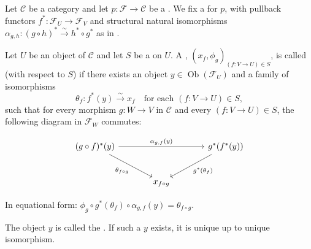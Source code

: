 \begin{definition}
\label{definition:effective_descent_datum_for_a_category_fibered_in_groupoids_over_a_category_relative_to_a_sieve_on_an_object_of_the_base_category}
Let $\mathcal{C}$ be a category and let $p: \mathcal{F} \to \mathcal{C}$ be a . We fix a  for $p$, with pullback functors $f^*: \mathcal{F}_U \to \mathcal{F}_V$ and structural natural isomorphisms $\alpha_{g,h}: (g \circ h)^* \xrightarrow{\sim} h^* \circ g^*$ as in .

Let $U$ be an object of $\mathcal{C}$ and let $S$ be a  on $U$. A , $(x_f, \phi_g)_{(f:V\to U)\in S}$, is called  (with respect to $S$) if there exists an object $y \in \operatorname{Ob}(\mathcal{F}_U)$ and a family of isomorphisms
$$
\theta_f: f^*(y) \xrightarrow{\sim} x_f \quad \text{for each } (f: V \to U) \in S,
$$
such that for every morphism $g: W \to V$ in $\mathcal{C}$ and every $(f: V \to U) \in S$, the following diagram in $\mathcal{F}_W$ commutes:

$$
\begin{tikzcd}[row sep=large, column sep=large]
(g \circ f)^*(y) \arrow[rr, "\alpha_{g,f}(y)"] \arrow[dr, "\theta_{f \circ g}"'] 
& & g^*(f^*(y)) \arrow[dl, "g^*(\theta_f)"] \\
& x_{f \circ g} & 
\end{tikzcd}
$$

In equational form: $\phi_g \circ g^*(\theta_f) \circ \alpha_{g,f}(y) = \theta_{f \circ g}$.

The object $y$ is called the . If such a $y$ exists, it is unique up to unique isomorphism.
\end{definition}
